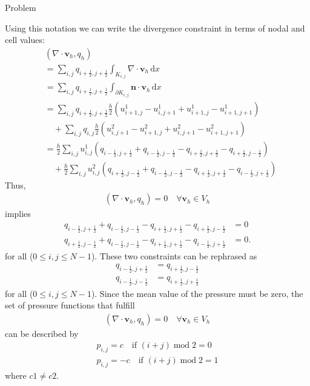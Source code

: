 \begin {blocktheorem}{Problem}
\begin{solution}
Using this notation we can write the divergence constraint in terms of nodal and cell values:
\begin{align*}
 &(\nabla \cdot \boldsymbol{v}_h, q_h)\\
   &= \sum_{i,j} q_{i+\frac12,j+\frac12} \int_{K_{i,j}} \nabla \cdot \boldsymbol{v}_h \,\mathrm{d}x\\
   &= \sum_{i,j} q_{i+\frac12,j+\frac12} \int_{\partial K_{i,j}} \boldsymbol{n} \cdot \boldsymbol{v}_h \,\mathrm{d}x\\
   &= \sum_{i,j} q_{i+\frac12,j+\frac12} \frac{h}{2}(u^1_{i+1,j}-u^1_{i,j+1}+u^1_{i+1,j}-u^1_{i+1,j+1})\\
      &\quad +\sum_{i,j} q_{i,j} \frac{h}{2}(u^2_{i,j+1}-u^2_{i+1,j}+u^2_{i,j+1}-u^2_{i+1,j+1})\\
   &= \frac{h}{2}\sum_{i,j} u^1_{i,j}(q_{i-\frac12,j+\frac12}+q_{i-\frac12,j-\frac12}-q_{i+\frac12,j+\frac12}-q_{i+\frac12,j-\frac12})\\
      &\quad +\frac{h}{2}\sum_{i,j} u^2_{i,j}(q_{i+\frac12,j-\frac12}+q_{i-\frac12,j-\frac12}-q_{i+\frac12,j+\frac12}-q_{i-\frac12,j+\frac12})
\end{align*}
Thus,
\begin{align*}
(\nabla \cdot \boldsymbol{v}_h, q_h)=0 \quad \forall \boldsymbol{v}_h\in V_h
\end{align*}
implies
\begin{align*}
q_{i-\frac12,j+\frac12}+q_{i-\frac12,j-\frac12}-q_{i+\frac12,j+\frac12}-q_{i+\frac12,j-\frac12} &=0 \\
q_{i+\frac12,j-\frac12}+q_{i-\frac12,j-\frac12}-q_{i+\frac12,j+\frac12}-q_{i-\frac12,j+\frac12} &=0.
\end{align*}
for all ($0\leq i,j \leq N-1$).
These two constraints can be rephrased as
\begin{align*}
q_{i-\frac12,j+\frac12} &= q_{i+\frac12,j-\frac12} \\
q_{i-\frac12,j-\frac12} &= q_{i+\frac12,j+\frac12}
\end{align*}
for all ($0\leq i,j \leq N-1$). Since the mean value of the pressure must be zero,
the set of pressure functions that fulfill
\begin{align}
(\nabla \cdot \boldsymbol{v}_h, q_h)=0 \quad \forall \boldsymbol{v}_h\in V_h
\end{align}
can be described by
\begin{align*}
 p_{i,j} = c \quad \text{if } (i+j) \operatorname{mod} 2 = 0\\
 p_{i,j} = -c \quad \text{if } (i+j) \operatorname{mod} 2 = 1
\end{align*}
where $c1\not=c2$.
\end{solution}
\end{blocktheorem}




